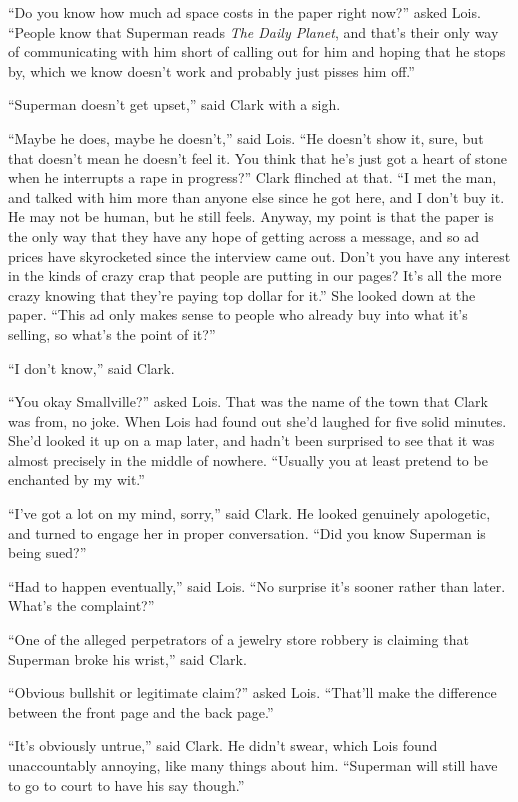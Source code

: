 \documentclass[ebook,12pt]{memoir}
\begin{document}
``Do you know how much ad space costs in the paper right now?'' asked
Lois. ``People know that Superman reads \emph{The Daily Planet}, and
that's their only way of communicating with him short of calling out for
him and hoping that he stops by, which we know doesn't work and probably
just pisses him off.''

``Superman doesn't get upset,'' said Clark with a sigh.

``Maybe he does, maybe he doesn't,'' said Lois. ``He doesn't show it,
sure, but that doesn't mean he doesn't feel it. You think that he's just
got a heart of stone when he interrupts a rape in progress?'' Clark
flinched at that. ``I met the man, and talked with him more than anyone
else since he got here, and I don't buy it. He may not be human, but he
still feels. Anyway, my point is that the paper is the only way that
they have any hope of getting across a message, and so ad prices have
skyrocketed since the interview came out. Don't you have any interest in
the kinds of crazy crap that people are putting in our pages? It's all
the more crazy knowing that they're paying top dollar for it.'' She
looked down at the paper. ``This ad only makes sense to people who
already buy into what it's selling, so what's the point of it?''

``I don't know,'' said Clark.

``You okay Smallville?'' asked Lois. That was the name of the town that
Clark was from, no joke. When Lois had found out she'd laughed for five
solid minutes. She'd looked it up on a map later, and hadn't been
surprised to see that it was almost precisely in the middle of nowhere.
``Usually you at least pretend to be enchanted by my wit.''

``I've got a lot on my mind, sorry,'' said Clark. He looked genuinely
apologetic, and turned to engage her in proper conversation. ``Did you
know Superman is being sued?''

``Had to happen eventually,'' said Lois. ``No surprise it's sooner
rather than later. What's the complaint?''

``One of the alleged perpetrators of a jewelry store robbery is claiming
that Superman broke his wrist,'' said Clark.

``Obvious bullshit or legitimate claim?'' asked Lois. ``That'll make the
difference between the front page and the back page.''

``It's obviously untrue,'' said Clark. He didn't swear, which Lois found
unaccountably annoying, like many things about him. ``Superman will
still have to go to court to have his say though.''
\end{document}
